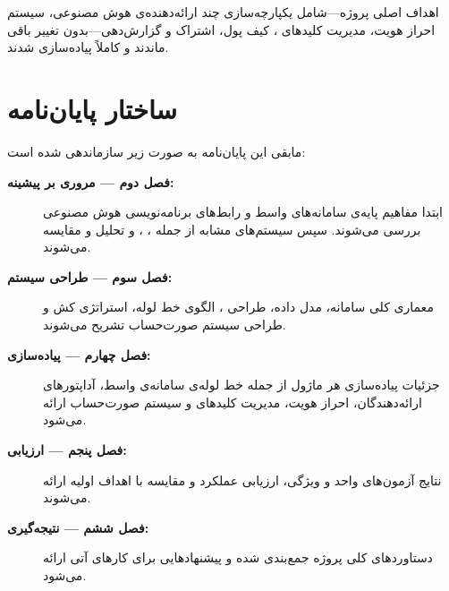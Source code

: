 اهداف اصلی پروژه—شامل یکپارچه‌سازی چند ارائه‌دهنده‌ی هوش مصنوعی، سیستم
احراز هویت، مدیریت کلیدهای ، کیف پول، اشتراک و گزارش‌دهی—بدون
تغییر باقی ماندند و کاملاً پیاده‌سازی شدند.

\section{ساختار پایان‌نامه}
\label{sec:structure}

مابقی این پایان‌نامه به صورت زیر سازماندهی شده است:

\begin{description}
  \item[\textbf{فصل دوم — مروری بر پیشینه:}]
    ابتدا مفاهیم پایه‌ی سامانه‌های واسط و رابط‌های برنامه‌نویسی هوش مصنوعی
    بررسی می‌شوند. سپس سیستم‌های مشابه از جمله ، ،
     و  تحلیل و مقایسه می‌شوند.

  \item[\textbf{فصل سوم — طراحی سیستم:}]
    معماری کلی سامانه، مدل داده، طراحی ، الگوی خط لوله، استراتژی کش
    و طراحی سیستم صورت‌حساب تشریح می‌شوند.

  \item[\textbf{فصل چهارم — پیاده‌سازی:}]
    جزئیات پیاده‌سازی هر ماژول از جمله خط لوله‌ی سامانه‌ی واسط، آداپتورهای
    ارائه‌دهندگان، احراز هویت، مدیریت کلیدهای  و سیستم صورت‌حساب
    ارائه می‌شود.

  \item[\textbf{فصل پنجم — ارزیابی:}]
    نتایج آزمون‌های واحد و ویژگی، ارزیابی عملکرد و مقایسه با اهداف اولیه
    ارائه می‌شوند.

  \item[\textbf{فصل ششم — نتیجه‌گیری:}]
    دستاوردهای کلی پروژه جمع‌بندی شده و پیشنهادهایی برای کارهای آتی ارائه
    می‌شود.
\end{description}
